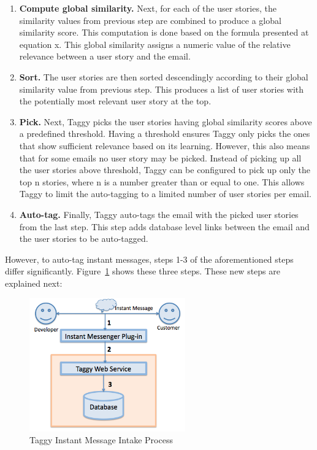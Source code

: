 \begin{enumerate}
	\item \textbf{Compute global similarity.} Next, for each of the user stories, the similarity values from previous step are combined to produce a global similarity score. This computation is done based on the formula presented at equation x. This global similarity assigns a numeric value of the relative relevance between a user story and the email.
	
	\item \textbf{Sort.} The user stories are then sorted descendingly according to their global similarity value from previous step. This produces a list of user stories with the potentially most relevant user story at the top.
	
	\item \textbf{Pick.} Next, Taggy picks the user stories having global similarity scores above a predefined threshold. Having a threshold ensures Taggy only picks the ones that show sufficient relevance based on its learning. However, this also means that for some emails no user story may be picked. Instead of picking up all the user stories above threshold, Taggy can be configured to pick up only the top n stories, where n is a number greater than or equal to one. This allows Taggy to limit the auto-tagging to a limited number of user stories per email.
	
	\item \textbf{Auto-tag.}	Finally, Taggy auto-tags the email with the picked user stories from the last step. This step adds database level links between the email and the user stories to be auto-tagged.
\end{enumerate}

However, to auto-tag instant messages, steps 1-3 of the aforementioned steps differ significantly. Figure~\ref{fig:im_intake} shows these three steps. These new steps are explained next:

\begin{figure}[!h]
	\centering
	\includegraphics[width=0.6\textwidth]{im_intake.png}
	\caption{Taggy Instant Message Intake Process}
	\label{fig:im_intake}
\end{figure}


